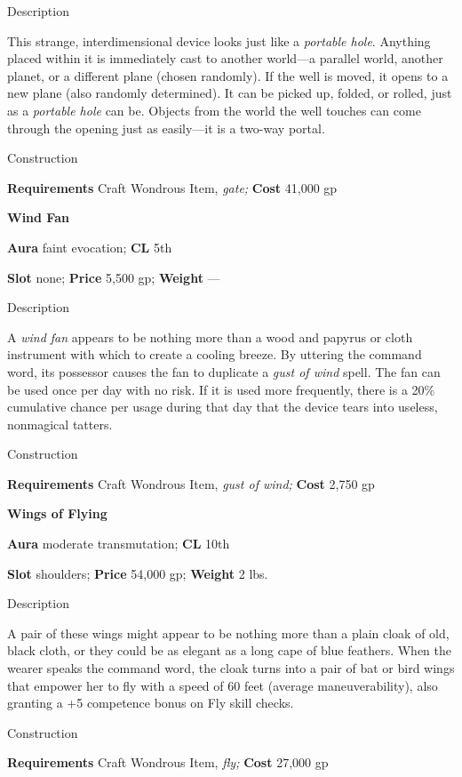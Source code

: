 Description
				
This strange, interdimensional device looks just like a \textit{portable hole}. Anything placed within it is immediately cast to another world---a parallel world, another planet, or a different plane (chosen randomly). If the well is moved, it opens to a new plane (also randomly determined). It can be picked up, folded, or rolled, just as a \textit{portable hole} can be. Objects from the world the well touches can come through the opening just as easily---it is a two-way portal.
				
Construction
				
\textbf{Requirements} Craft Wondrous Item,\textit{ gate;}\textbf{ Cost }41,000 gp
				
\textbf{Wind Fan}
				
\textbf{Aura} faint evocation;\textbf{ CL }5th
				
\textbf{Slot} none; \textbf{Price} 5,500 gp; \textbf{Weight }---
				
Description
				
A \textit{wind fan} appears to be nothing more than a wood and papyrus or cloth instrument with which to create a cooling breeze. By uttering the command word, its possessor causes the fan to duplicate a \textit{gust of wind} spell. The fan can be used once per day with no risk. If it is used more frequently, there is a 20\% cumulative chance per usage during that day that the device tears into useless, nonmagical tatters. 
				
Construction
				
\textbf{Requirements} Craft Wondrous Item,\textit{ gust of wind;}\textbf{ Cost }2,750 gp
				
\textbf{Wings of Flying}
				
\textbf{Aura} moderate transmutation;\textbf{ CL }10th
				
\textbf{Slot} shoulders; \textbf{Price} 54,000 gp; \textbf{Weight} 2 lbs.
				
Description
				
A pair of these wings might appear to be nothing more than a plain cloak of old, black cloth, or they could be as elegant as a long cape of blue feathers. When the wearer speaks the command word, the cloak turns into a pair of bat or bird wings that empower her to fly with a speed of 60 feet (average maneuverability), also granting a +5 competence bonus on Fly skill checks. 
				
Construction
				
\textbf{Requirements} Craft Wondrous Item,\textit{ fly;}\textbf{ Cost }27,000 gp
        	
